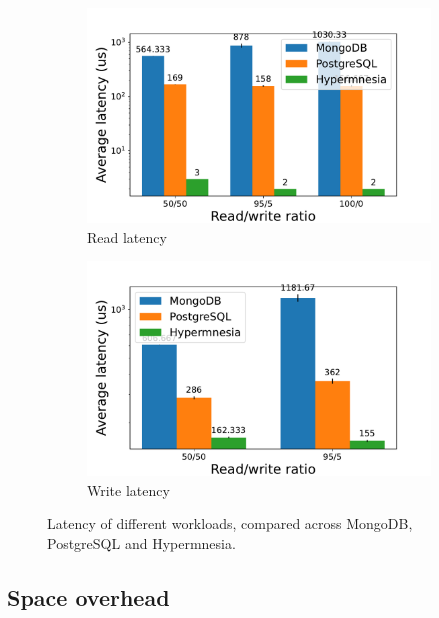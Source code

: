 \begin{figure}[htp]
  \centering
  \begin{subfigure}[t]{0.48\columnwidth}
    \centering
    \includegraphics[width=\columnwidth]{figures/lat_workload_read_all.pdf}
    \caption{Read latency}
    \label{fig:tp workload read all}
  \end{subfigure}
  \begin{subfigure}[t]{0.48\columnwidth}
    \centering
    \includegraphics[width=\columnwidth]{figures/lat_workload_write_all.pdf}
    \caption{Write latency}
    \label{fig:lat workload write all}
  \end{subfigure}
  \caption{Latency of different workloads, compared across MongoDB,
  PostgreSQL and Hypermnesia.}
  \label{fig:lat workload all}
\end{figure}


\subsection{Space overhead} \label{sec:eval space}

